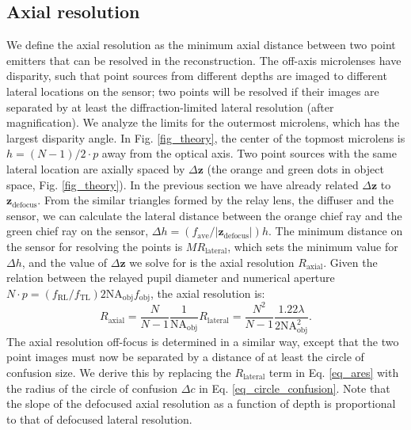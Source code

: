 \documentclass{osa-article}
\begin{document}
\subsection{Axial resolution}
\label{section_ares}
We define the axial resolution as the minimum axial distance between two point emitters that can be resolved in the reconstruction. The off-axis microlenses have disparity, such that point sources from different depths are imaged to different lateral locations on the sensor; two points will be resolved if their images are separated by at least the diffraction-limited lateral resolution (after magnification). We analyze the limits for the outermost microlens, which has the largest disparity angle. In Fig. \ref{fig_theory}, the center of the topmost microlens is $h = (N-1) /2 \cdot p$ away from the optical axis. Two point sources with the same lateral location are axially spaced by $\Delta \mathbf{z}$ (the orange and green dots in object space, Fig. \ref{fig_theory}). In the previous section we have already related $\Delta \mathbf{z}$ to $\mathbf{z}_\mathrm{defocus}$. From the similar triangles formed by the relay lens, the diffuser and the sensor, we can calculate the lateral distance between the orange chief ray and the green chief ray on the sensor, $\Delta h = (f_{\mathrm{ave}} / | \mathbf{z}_\mathrm{defocus} |) h $. The minimum distance on the sensor for resolving the points is $MR_\mathrm{lateral}$, which sets the minimum value for $\Delta h$, and the value of  $\Delta \mathbf{z}$ we solve for is the axial resolution $R_\mathrm{axial}$. Given the relation between the relayed pupil diameter and numerical aperture $N \cdot p =( f_\mathrm{RL} / f_\mathrm{TL})2 \mathrm{NA}_\mathrm{obj} f_\mathrm{obj}$, the axial resolution is:
\begin{equation}
\label{eq_ares}
R_\mathrm{axial} =\frac{N}{N-1} \frac{1}{ \mathrm{NA}_\mathrm{obj} } R_\mathrm{lateral} =  \frac{N^2}{N-1} \frac{1.22  \lambda}{2 \mathrm{NA}_\mathrm{obj}^2}  .
\end{equation}
The axial resolution off-focus is determined in a similar way, except that the two point images must now be separated by a distance of at least the circle of confusion size. We derive this by replacing the $R_\mathrm{lateral}$ term in Eq. \ref{eq_ares} with the radius of the circle of confusion $\Delta c$ in Eq. \ref{eq_circle_confusion}. Note that the slope of the defocused axial resolution as a function of depth is proportional to that of defocused lateral resolution.
\end{document}
